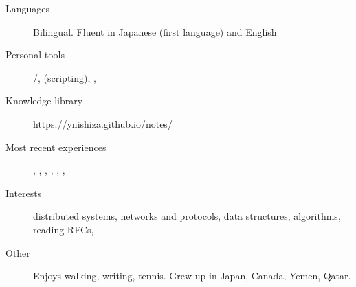 \begin{description}
  \liststyle
  \item[Languages]{Bilingual. Fluent in Japanese (first language) and English}
  \item[Personal tools]{\rfneovim /\rfvim, \rfbash (scripting), \rfgit, \rftmux }
  \item[Knowledge library]{https://ynishiza.github.io/notes/}
  \item[Most recent experiences]{\rfnodejs, \rfmongodb, \rfredis, \rfneofj, \rfdocker, \rfreact, \rfcypress  }
  \item[Interests]{distributed systems, networks and protocols, data structures, algorithms, reading RFCs, \rfhaskell }
  \item[Other]{Enjoys walking, writing, tennis. Grew up in Japan, Canada, Yemen, Qatar.}
\end{description}
